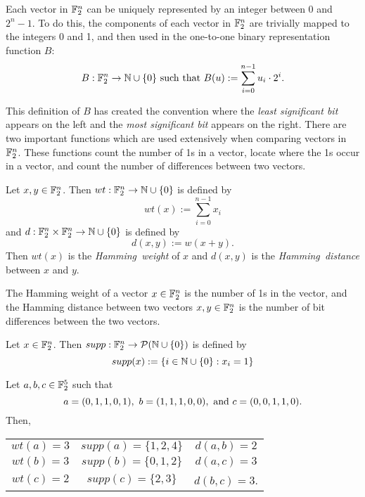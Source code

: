 \par Each vector in $\mathbb{F}_2^n$ can be uniquely represented by an integer
between $0$ and $2^n-1$. To do this, the components of each vector in
$\mathbb{F}_2^n$ are trivially mapped to the integers 0 and 1, and then used in
the one-to-one binary representation function $B$:
\begin{equation}
	B:\gftwo^n\rightarrow\nnn\cup\{0\}\ \allowbreak
  {\rm such\ that }\ \allowbreak B(u) := \sum_{i=0}^{n-1}u_i\cdot2^i.
\end{equation}

\par This definition of $B$ has created the convention where the
{\em least significant bit} appears on the left and the 
{\em most significant bit} appears on the right. There are two important
functions which are used extensively when comparing vectors in $\mathbb{F}_2^n$.
These functions count the number of 1s in a vector, locate where the 1s
occur in a vector, and count the number of differences between two vectors.

\begin{definition}
\label{def:Hamming}
	Let $x,y\in\mathbb{F}_2^n$. Then $wt:\mathbb{F}_2^n\rightarrow\mathbb{N}\cup\{0\}$
  is defined by
	\[
	  wt(x):=\sum_{i=0}^{n-1}x_i
	\]
	and $d:\mathbb{F}_2^n\times\mathbb{F}_2^n\rightarrow\mathbb{N}\cup\{0\}$ is defined by
	\[
	  d(x,y):=w(x+y).
	\]
	Then $wt(x)$ is the {\em Hamming\ weight} of $x$ and $d(x,y)$ is the
	{\em Hamming\ distance} between $x$ and $y$.
\end{definition}

\begin{remark}
	The Hamming weight of a vector $x\in\mathbb{F}_2^n$ is the number of 1s in the
  vector, and the Hamming distance between two vectors $x,y\in\mathbb{F}_2^n$ is
  the number of bit differences between the two vectors.
\end{remark}

\begin{definition}
\label{def:support}
	Let $x\in\mathbb{F}_2^n$. Then $supp:\mathbb{F}_2^n\rightarrow\allowbreak
  \mathcal{P}(\mathbb{N}\cup\{0\})$ is defined by
	\[
		supp(x):=\{i\in\mathbb{N}\cup\{0\}:x_i=1\}
	\]
\end{definition}

\begin{example}
	Let $a,b,c\in\mathbb{F}_2^5$ such that
	\[
	a=(0,1,1,0,1),\ b=(1,1,1,0,0),\ {\rm and}\ c=(0,0,1,1,0).
	\]
	Then,
	\begin{center}
		\begin{tabular}{c c c}
			$wt(a)=3$&$supp(a)=\{1,2,4\}$&$d(a,b)=2$\\
			$wt(b)=3$&$supp(b)=\{0,1,2\}$&$d(a,c)=3$\\
			$wt(c)=2$&$ supp(c)=\{2,3\}$ &$d(b,c)=3$.\\
		\end{tabular}
	\end{center}
\end{example}

